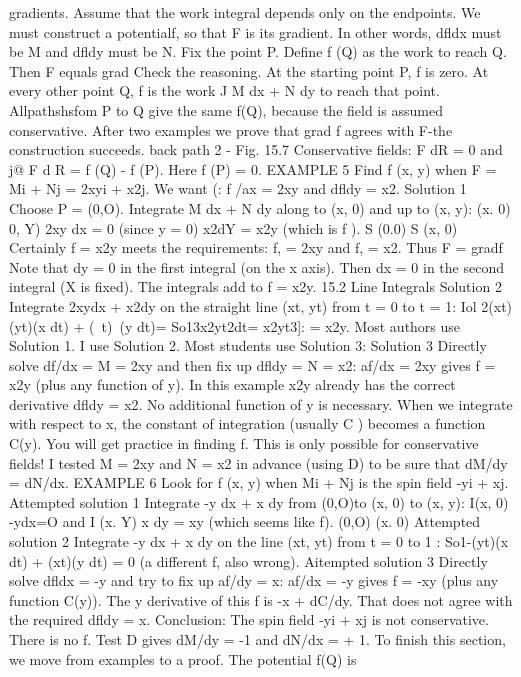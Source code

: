 gradients. Assume that the work integral depends only on the endpoints. We must
construct a potentialf, so that F is its gradient. In other words, dfldx must be M and
dfldy must be N.
Fix the point P. Define f (Q) as the work to reach Q. Then F equals grad
Check the reasoning. At the starting point P, f is zero. At every other point Q, f is
the work J M dx + N dy to reach that point. Allpathshsfom P to Q give the same f(Q),
because the field is assumed conservative. After two examples we prove that grad f
agrees with F-the construction succeeds.
back path 2 -
Fig. 15.7 Conservative fields:  F dR = 0 and j@ F d R = f (Q) - f (P). Here f (P) = 0.
EXAMPLE 5 Find f (x, y) when F = Mi + Nj = 2xyi + x2j. We want (: f /ax = 2xy
and dfldy = x2.
Solution 1 Choose P = (0,O). Integrate M dx + N dy along to (x, 0) and up to (x, y):
(x. 0) 0, Y)
2xy dx = 0 (since y = 0) x2dY = x2y (which is f ). S (0.0) S (x, 0)
Certainly f = x2y meets the requirements: f, = 2xy and f, = x2. Thus F = gradf Note
that dy = 0 in the first integral (on the x axis). Then dx = 0 in the second integral
(X is fixed). The integrals add to f = x2y. 
15.2 Line Integrals
Solution 2 Integrate 2xydx + x2dy on the straight line (xt, yt) from t = 0 to t = 1:
Iol 2(xt)(yt)(x dt) + (~t)~(y dt)= So13x2yt2dt= x2yt3]: = x2y.
Most authors use Solution 1. I use Solution 2. Most students use Solution 3:
Solution 3 Directly solve df/dx = M = 2xy and then fix up dfldy = N = x2:
af/dx = 2xy gives f = x2y (plus any function of y).
In this example x2y already has the correct derivative dfldy = x2. No additional
function of y is necessary. When we integrate with respect to x, the constant of
integration (usually C ) becomes a function C(y).
You will get practice in finding f. This is only possible for conservative fields! I
tested M = 2xy and N = x2 in advance (using D) to be sure that dM/dy = dN/dx.
EXAMPLE 6 Look for f (x, y) when Mi + Nj is the spin field -yi + xj.
Attempted solution 1 Integrate -y dx + x dy from (0,O)to (x, 0) to (x, y):
I(x, 0)
-ydx=O and I
(x. Y)
x dy = xy (which seems like f).
(0,O) (x. 0)
Attempted solution 2 Integrate -y dx + x dy on the line (xt, yt) from t = 0 to 1 :
So1-(yt)(x dt) + (xt)(y dt) = 0 (a different f, also wrong).
Aitempted solution 3 Directly solve dfldx = -y and try to fix up af/dy = x:
af/dx = -y gives f = -xy (plus any function C(y)).
The y derivative of this f is -x + dC/dy. That does not agree with the required
dfldy = x. Conclusion: The spin field -yi + xj is not conservative. There is no f.
Test D gives dM/dy = -1 and dN/dx = + 1.
To finish this section, we move from examples to a proof. The potential f(Q) is
